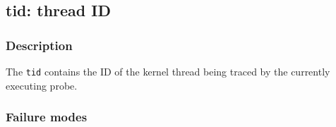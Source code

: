 \clearpage
{}
{}
\label{vars:tid}
\subsection*{tid: thread ID}

\subsubsection*{Description}

The \verb|tid| contains the ID of the kernel thread being traced by
the currently executing probe.

\subsubsection*{Failure modes}

